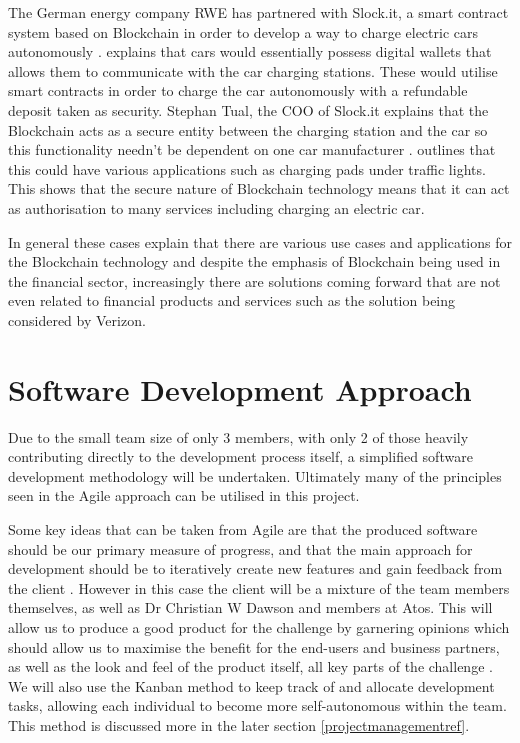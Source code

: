 \documentclass{article}
\begin{document}
\par
The German energy company RWE has partnered with Slock.it, a smart contract system based on Blockchain in order to develop a way to charge electric cars autonomously \parencite{rweblockchain}. \textcite{rweblockchain} explains that cars would essentially possess digital wallets that allows them to communicate with the car charging stations. These would utilise smart contracts in order to charge the car autonomously with a refundable deposit taken as security. Stephan Tual, the COO of Slock.it explains that the Blockchain acts as a secure entity between the charging station and the car so this functionality needn't be dependent on one car manufacturer \parencite{rweblockchain}. \textcite{rweblockchain} outlines that this could have various applications such as charging pads under traffic lights. This shows that the secure nature of Blockchain technology means that it can act as authorisation to many services including charging an electric car.
\par
In general these cases explain that there are various use cases and applications for the Blockchain technology and despite the emphasis of Blockchain being used in the financial sector, increasingly there are solutions coming forward that are not even related to financial products and services such as the solution being considered by Verizon. 
\section{Software Development Approach}
Due to the small team size of only 3 members, with only 2 of those heavily contributing directly to the development process itself, a simplified software development methodology will be undertaken. Ultimately many of the principles seen in the Agile approach can be utilised in this project.
\par
Some key ideas that can be taken from Agile are that the produced software should be our primary measure of progress, and that the main approach for development should be to iteratively create new features and gain feedback from the client \parencite{agilemanifesto}. However in this case the client will be a mixture of the team members themselves, as well as Dr Christian W Dawson and members at Atos. This will allow us to produce a good product for the challenge by garnering opinions which should allow us to maximise the benefit for the end-users and business partners, as well as the look and feel of the product itself, all key parts of the challenge \parencite{atosrules}. We will also use the Kanban method to keep track of and allocate development tasks, allowing each individual to become more self-autonomous within the team. This method is discussed more in the later section \ref{projectmanagementref}.
\end{document}
